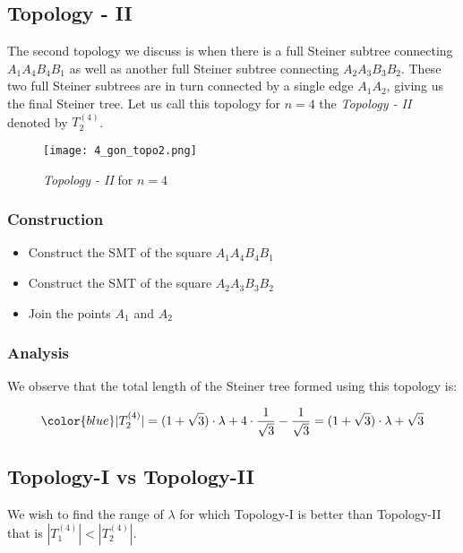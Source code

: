 \vspace{0.2cm}
\subsection{Topology - II}
\vspace{0.2cm}

The second topology we discuss is when there is a full Steiner subtree connecting $A_1A_4B_4B_1$ as well as another full Steiner subtree connecting $A_2A_3B_3B_2$. These two full Steiner subtrees are in turn connected by a single edge $A_1A_2$, giving us the final Steiner tree. Let us call this topology for $n = 4$ the \emph{Topology - II} denoted by $T^{(4)}_2$.


\begin{figure}[h!]
\centering
\texttt{[image: 4\_gon\_topo2.png]}
\caption{ \emph{Topology - II} for $n = 4$ }
\end{figure}

\subsubsection{Construction}

\begin{itemize}
    \item Construct the SMT of the square $A_1A_4B_4B_1$
    \item Construct the SMT of the square $A_2A_3B_3B_2$
    \item Join the points $A_1$ and $A_2$
\end{itemize}

\subsubsection{Analysis}

We observe that the total length of the Steiner tree formed using this topology is:

$$\color{blue}
|T^{(4)}_2| = (1 + \sqrt{3}) \cdot \lambda + 4 \cdot \frac{1}{\sqrt{3}} - \frac{1}{\sqrt{3}} = (1 + \sqrt{3}) \cdot \lambda + \sqrt{3}
$$

\vspace{0.2cm}
\subsection{Topology-I vs Topology-II}
\vspace{0.2cm}

We wish to find the range of $\lambda$ for which Topology-I is better than Topology-II that is $|T^{(4)}_1| < |T^{(4)}_2|$.

